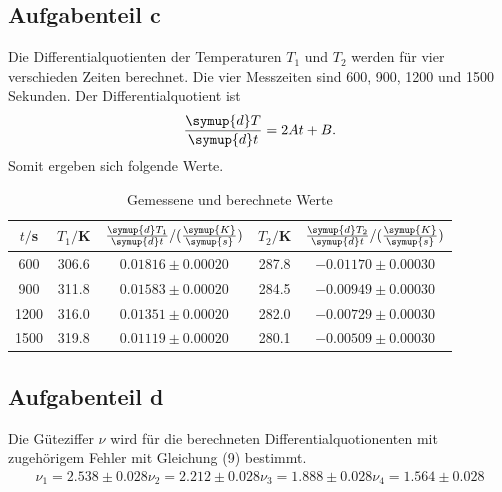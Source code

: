 \subsection{Aufgabenteil c}
Die Differentialquotienten der Temperaturen $T_1$ und $T_2$ werden für vier verschieden
Zeiten berechnet. Die vier Messzeiten sind 600, 900, 1200 und 1500 Sekunden. Der
Differentialquotient ist
\begin{equation}
  \frac{\symup{d}T}{\symup{d}t} = 2At + B .
\end{equation}
Somit ergeben sich folgende Werte.
\begin{table}
  \centering
  \caption{Gemessene und berechnete Werte}
  \label{tab:Parameter}
  \begin{tabular}{c c c c c}
    \toprule
    $t/$s & $T_1/$K & $\frac{\symup{d}T_1}{\symup{d}t}/(\frac{\symup{K}}{\symup{s}})$ & $T_2/$K & $\frac{\symup{d}T_2}{\symup{d}t}/(\frac{\symup{K}}{\symup{s}})$  \\
    \midrule
      600 & 306.6 & $0.01816 \pm 0.00020$ & 287.8 & $-0.01170 \pm 0.00030$ \\
      900 & 311.8 & $0.01583 \pm 0.00020$ & 284.5 & $-0.00949 \pm 0.00030$ \\
      1200 & 316.0 & $0.01351 \pm 0.00020$ & 282.0 & $-0.00729 \pm 0.00030$ \\
      1500 & 319.8 & $0.01119 \pm 0.00020$ & 280.1 & $-0.00509 \pm 0.00030$ \\
   \bottomrule
 \end{tabular}
\end{table}
\subsection{Aufgabenteil d}
Die Güteziffer $\nu$ wird für die berechneten Differentialquotionenten mit zugehörigem Fehler mit Gleichung (9) bestimmt.
\begin{align}
    \nu_1 = 2.538 \pm 0.028
    \nu_2 = 2.212 \pm 0.028
    \nu_3 = 1.888 \pm 0.028
    \nu_4 = 1.564 \pm 0.028
\end{align}

